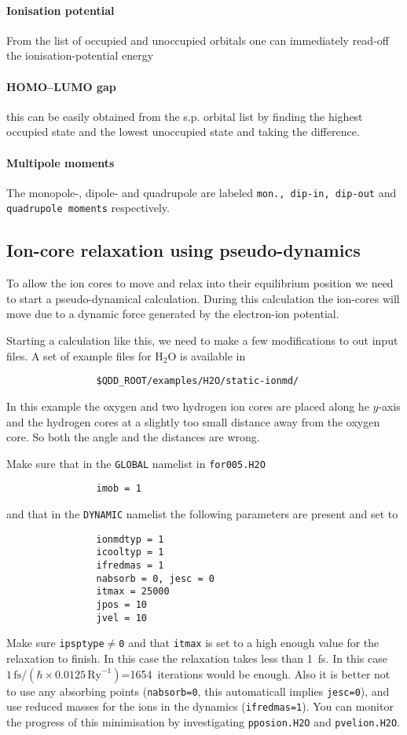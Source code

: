 \documentclass[11pt,a4paper]{article}
\begin{document}
			\paragraph{Ionisation potential} From the list of occupied and unoccupied orbitals one can immediately read-off the ionisation-potential energy
			
			\paragraph{HOMO–LUMO gap} this can be easily obtained from the s.p. orbital list by finding the highest occupied state and the lowest unoccupied state and taking the difference. 
			
			\paragraph{Multipole moments} The monopole-, dipole- and quadrupole are labeled \texttt{mon., dip-in, dip-out} and \texttt{quadrupole moments} respectively.
			
		\subsection{Ion-core relaxation using pseudo-dynamics}
			To allow the ion cores to move and relax into their equilibrium position we need to start a pseudo-dynamical calculation. During this calculation the ion-cores will move due to a dynamic force generated by the electron-ion potential.
			
			Starting a calculation like this, we need to make a few modifications to out input files. A set of example files for H$_2$O is available in
			\begin{verbatim}
				$QDD_ROOT/examples/H2O/static-ionmd/
			\end{verbatim}
			In this example the oxygen and two hydrogen ion cores are placed along he $y$-axis and the hydrogen cores at a slightly too small distance away from the oxygen core. So both the angle and the distances are wrong.
			
			Make sure that in the \texttt{GLOBAL} namelist in \texttt{for005.H2O}
			\begin{verbatim}
				imob = 1
			\end{verbatim}
			and that in the \texttt{DYNAMIC} namelist the following parameters are present and set to
			\begin{verbatim}
				ionmdtyp = 1
				icooltyp = 1
				ifredmas = 1
				nabsorb = 0, jesc = 0
				itmax = 25000
				jpos = 10
				jvel = 10	
			\end{verbatim}
			Make sure \texttt{ipsptype}$\neq$\texttt{0} and that \texttt{itmax} is set to a high enough value for the relaxation to finish. In this case the relaxation takes less than 1~fs. In this case $1\,\mathrm{fs}/(\hbar\times 0.0125\,\mathrm{Ry}^{-1})$=1654~iterations would be enough. Also it is better not to use any absorbing points (\texttt{nabsorb=0}, this automaticall implies \texttt{jesc=0}), and use reduced masses for the ions in the dynamics (\texttt{ifredmas=1}). You can monitor the progress of this minimisation by investigating \texttt{pposion.H2O} and \texttt{pvelion.H2O}.
\end{document}
